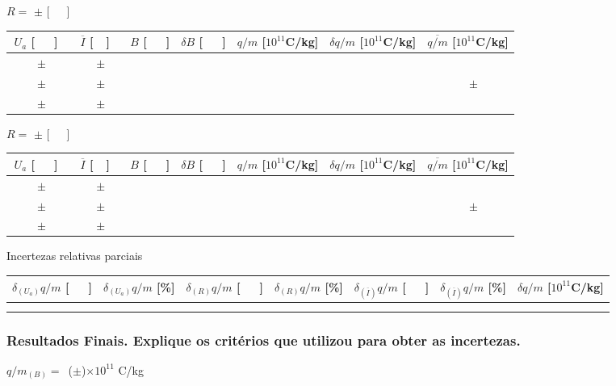\documentclass[a4paper,12pt]{article}  %
\begin{document}
\begin{center}
 \noindent	$R =$ \underline{\makebox[1.5cm][r]{~}}  $\pm$  	\underline{\makebox[1cm][r]{~}}  [~~~]
	\begin{tabular}{|c|c|c|c|c|c|c|}  
	\hline %
	  $U_a$ [~~~] & $\overline{I}$ [~~] &  $B$ [~~~] & $\delta B$  [~~~] & $q/m$ [$10^{11}$C/kg] & $\delta q/m$ [$10^{11}$C/kg] & $\overline{q/m}$ [$10^{11}$C/kg]\\ \hline 
	 $\qquad \pm \quad$ &$\qquad \pm \quad$&&&&& \\ \cline{2-6}
	 $\qquad \pm \quad$ &$\qquad \pm \quad$&&&&& $\qquad \pm \quad$ \\ \cline{2-6}
	 $\qquad \pm \quad$ &$\qquad \pm \quad$&&&&& \\
	 \hline 
	\end{tabular}

\noindent	$R =$ \underline{\makebox[1.5cm][r]{~}}  $\pm$  	\underline{\makebox[1cm][r]{~}}  [~~~]
	\begin{tabular}{|c|c|c|c|c|c|c|}  
	\hline %
	  $U_a$ [~~~] & $\overline{I}$ [~~] &  $B$ [~~~] & $\delta B$  [~~~] & $q/m$ [$10^{11}$C/kg] & $\delta q/m$ [$10^{11}$C/kg] & $\overline{q/m}$ [$10^{11}$C/kg]\\ \hline 
	 $\qquad \pm \quad$ &$\qquad \pm \quad$&&&&& \\ \cline{2-6}
	 $\qquad \pm \quad$ &$\qquad \pm \quad$&&&&& $\qquad \pm \quad$ \\ \cline{2-6}
	 $\qquad \pm \quad$ &$\qquad \pm \quad$&&&&& \\
	 \hline 
	\end{tabular}
\end{center}

Incertezas relativas parciais

	\begin{small}
	\begin{tabular}{|c|c|c|c|c|c|c|}  
	\hline %
	  $\delta_{(U_a)}  q/m$ [~~~] &  $ \delta_{(U_a)} q/m$ [\%] & $\delta_{(R)}  q/m$ [~~~] & $\delta_{(R)}  q/m$ [\%] & 
	  $\delta_{(\overline{I})}  q/m $ [~~~] & $\delta_{(\overline{I})}  q/m $ [\%] & $\delta  q/m$ [$10^{11}$C/kg]\\ \hline 
	 &&&&&& \\ 
	 &&&&&& \\ \hline
	\end{tabular}
	 \end{small}

\subsubsection{\sf Resultados Finais. Explique os critérios que utilizou para obter as incertezas.}
\noindent  $q/m_{(B)} =$~(\underline{\makebox[1.5cm][r]{~}}$\pm$\underline{\makebox[1cm][r]{~}})$\times 10^{11}\,\,$C/kg  \\  
\end{document}
